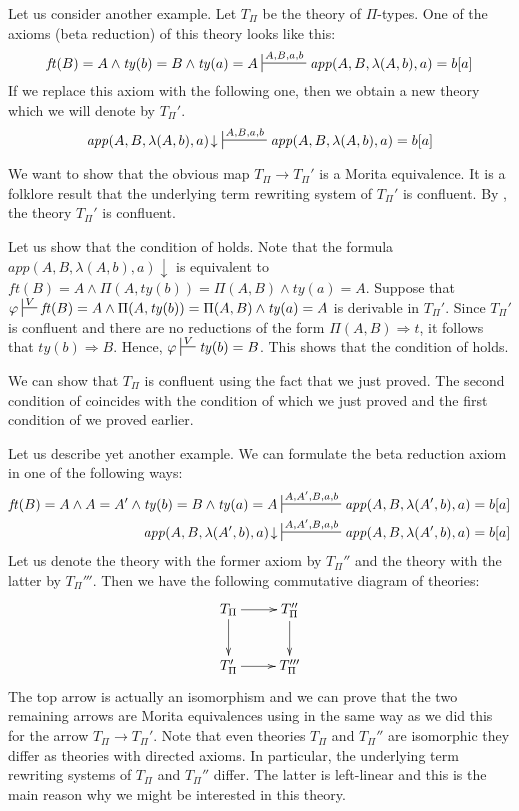 \documentclass[reqno]{amsart}
\theoremstyle{definition}
\theoremstyle{remark}
\newcommand{\app}{\mathit{app}}
\newcommand{\ft}{\mathit{ft}}
\newcommand{\ty}{\mathit{ty}}
\numberwithin{figure}{section}
\begin{document}
Let us consider another example.
Let $T_\Pi$ be the theory of $\Pi$-types.
One of the axioms (beta reduction) of this theory looks like this:
\[ \ft(B) = A \land \ty(b) = B \land \ty(a) = A \sststile{}{A,B,a,b} \app(A,B,\lambda(A,b),a) = b[a] \]
If we replace this axiom with the following one, then we obtain a new theory which we will denote by $T_\Pi'$.
\[ \app(A,B,\lambda(A,b),a)\!\downarrow\ \sststile{}{A,B,a,b} \app(A,B,\lambda(A,b),a) = b[a] \]

We want to show that the obvious map $T_\Pi \to T_\Pi'$ is a Morita equivalence.
It is a folklore result that the underlying term rewriting system of $T_\Pi'$ is confluent.
By , the theory $T_\Pi'$ is confluent.

Let us show that the condition of  holds.
Note that the formula $\app(A,B,\lambda(A,b),a)\!\downarrow$ is equivalent to $\ft(B) = A \land \Pi(A,\ty(b)) = \Pi(A,B) \land \ty(a) = A$.
Suppose that $\varphi \sststile{}{V} \ft(B) = A \land \Pi(A,\ty(b)) = \Pi(A,B) \land \ty(a) = A$ is derivable in $T_\Pi'$.
Since $T_\Pi'$ is confluent and there are no reductions of the form $\Pi(A,B) \Rightarrow t$, it follows that $\ty(b) \Rightarrow B$.
Hence, $\varphi \sststile{}{V} \ty(b) = B$.
This shows that the condition of  holds.

We can show that $T_\Pi$ is confluent using the fact that we just proved.
The second condition of  coincides with the condition of  which we just proved and the first condition of  we proved earlier.

Let us describe yet another example.
We can formulate the beta reduction axiom in one of the following ways:
\begin{align*}
\ft(B) = A \land A = A' \land \ty(b) = B \land \ty(a) = A & \sststile{}{A,A',B,a,b} \app(A,B,\lambda(A',b),a) = b[a] \\
\app(A,B,\lambda(A',b),a)\!\downarrow & \sststile{}{A,A',B,a,b} \app(A,B,\lambda(A',b),a) = b[a]
\end{align*}
Let us denote the theory with the former axiom by $T_\Pi''$ and the theory with the latter by $T_\Pi'''$.
Then we have the following commutative diagram of theories:
\[ \xymatrix{ T_\Pi  \ar[r] \ar[d]  & T_\Pi'' \ar[d] \\
              T_\Pi' \ar[r]         & T_\Pi'''
            } \]
The top arrow is actually an isomorphism and we can prove that the two remaining arrows are Morita equivalences using  in the same way as we did this for the arrow $T_\Pi \to T_\Pi'$.
Note that even theories $T_\Pi$ and $T_\Pi''$ are isomorphic they differ as theories with directed axioms.
In particular, the underlying term rewriting systems of $T_\Pi$ and $T_\Pi''$ differ.
The latter is left-linear and this is the main reason why we might be interested in this theory.
\end{document}

